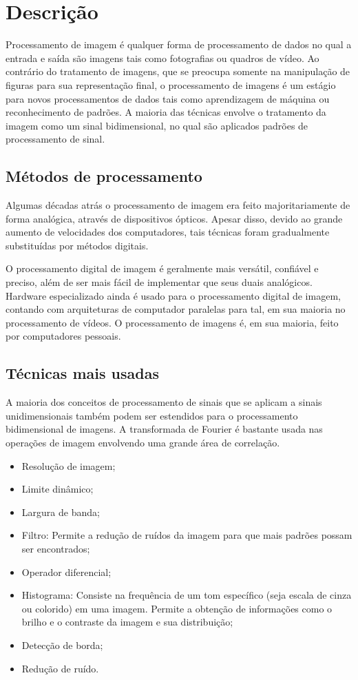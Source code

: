 \newpage
\section{Descrição}
	Processamento de imagem é qualquer forma de processamento de dados no qual a entrada e saída são imagens tais como fotografias ou quadros de vídeo. Ao contrário do tratamento de imagens, que se preocupa somente na manipulação de figuras para sua representação final, o processamento de imagens é um estágio para novos processamentos de dados tais como aprendizagem de máquina ou reconhecimento de padrões. A maioria das técnicas envolve o tratamento da imagem como um sinal bidimensional, no qual são aplicados padrões de processamento de sinal.

\subsection{Métodos de processamento}
	Algumas décadas atrás o processamento de imagem era feito majoritariamente de forma analógica, através de dispositivos ópticos. Apesar disso, devido ao grande aumento de velocidades dos computadores, tais técnicas foram gradualmente substituídas por métodos digitais.
	
	O processamento digital de imagem é geralmente mais versátil, confiável e preciso, além de ser mais fácil de implementar que seus duais analógicos. Hardware especializado ainda é usado para o processamento digital de imagem, contando com arquiteturas de computador paralelas para tal, em sua maioria no processamento de vídeos. O processamento de imagens é, em sua maioria, feito por computadores pessoais.

\subsection{Técnicas mais usadas}
	A maioria dos conceitos de processamento de sinais que se aplicam a sinais unidimensionais também podem ser estendidos para o processamento bidimensional de imagens. A transformada de Fourier é bastante usada nas operações de imagem envolvendo uma grande área de correlação.
	
	\begin{itemize}
		\item Resolução de imagem;
		\item Limite dinâmico;
		\item Largura de banda;
		\item Filtro: Permite a redução de ruídos da imagem para que mais padrões possam ser encontrados;
		\item Operador diferencial;
		\item Histograma: Consiste na frequência de um tom específico (seja escala de cinza ou colorido) em uma imagem. Permite a obtenção de informações como o brilho e o contraste da imagem e sua distribuição;
		\item Detecção de borda;
		\item Redução de ruído.
	\end{itemize}

